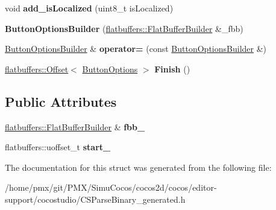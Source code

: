 \begin{DoxyCompactItemize}
void {\bfseries add\+\_\+is\+Localized} (uint8\+\_\+t is\+Localized)
\item 
\mbox{\label{structflatbuffers_1_1ButtonOptionsBuilder_abb571e5a48064a9039a1eb42ca9f7ce1}} 
{\bfseries Button\+Options\+Builder} (\hyperlink{classflatbuffers_1_1FlatBufferBuilder}{flatbuffers\+::\+Flat\+Buffer\+Builder} \&\+\_\+fbb)
\item 
\mbox{\label{structflatbuffers_1_1ButtonOptionsBuilder_a84b59c1f475b40cc5d13317442e7d210}} 
\hyperlink{structflatbuffers_1_1ButtonOptionsBuilder}{Button\+Options\+Builder} \& {\bfseries operator=} (const \hyperlink{structflatbuffers_1_1ButtonOptionsBuilder}{Button\+Options\+Builder} \&)
\item 
\mbox{\label{structflatbuffers_1_1ButtonOptionsBuilder_ae15ef738f13d2b9b666d65aae0fcc1a0}} 
\hyperlink{structflatbuffers_1_1Offset}{flatbuffers\+::\+Offset}$<$ \hyperlink{structflatbuffers_1_1ButtonOptions}{Button\+Options} $>$ {\bfseries Finish} ()
\end{DoxyCompactItemize}
\subsection*{Public Attributes}
\begin{DoxyCompactItemize}
\item 
\mbox{\label{structflatbuffers_1_1ButtonOptionsBuilder_a3eeb8c8a452793a61422f9db2045a465}} 
\hyperlink{classflatbuffers_1_1FlatBufferBuilder}{flatbuffers\+::\+Flat\+Buffer\+Builder} \& {\bfseries fbb\+\_\+}
\item 
\mbox{\label{structflatbuffers_1_1ButtonOptionsBuilder_ad5d6cd080afd0b699f14d8d1ab02b4ef}} 
flatbuffers\+::uoffset\+\_\+t {\bfseries start\+\_\+}
\end{DoxyCompactItemize}


The documentation for this struct was generated from the following file\+:\begin{DoxyCompactItemize}
\item 
/home/pmx/git/\+P\+M\+X/\+Simu\+Cocos/cocos2d/cocos/editor-\/support/cocostudio/C\+S\+Parse\+Binary\+\_\+generated.\+h\end{DoxyCompactItemize}
